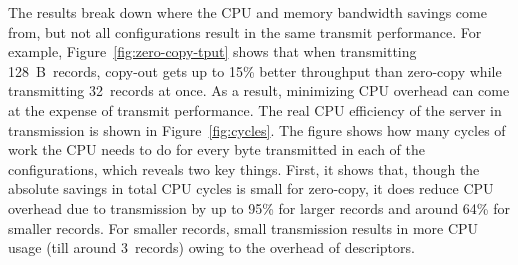 


The results break down where the CPU and memory bandwidth savings come from,
but not all configurations result in the same transmit performance. For
example, Figure~\ref{fig:zero-copy-tput} shows that when transmitting
128~B~records, copy-out gets up to 15\% better throughput than zero-copy while transmitting
32~records at once. As a result, minimizing CPU overhead can come at the expense of transmit
performance.  The real CPU efficiency of the server in transmission is shown in
Figure~\ref{fig:cycles}. The figure shows how many cycles of work the CPU needs to do
for every byte transmitted in each of the configurations, which reveals two key things.
First, it shows that, though the absolute savings in total CPU cycles is small
for zero-copy, it does reduce CPU overhead due to transmission by up to 95\% for 
larger records and around 64\% for smaller records. For smaller records, small transmission
results in more CPU usage (till around 3~records) owing to the overhead of descriptors.


%

%



